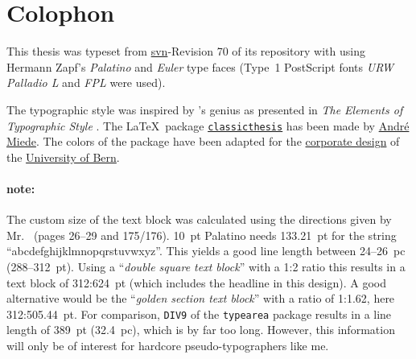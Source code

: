 \pagestyle{empty}
\hfill
\vfill
\section*{Colophon}
This thesis was typeset from \href{http://subversion.apache.org/}{\acs{svn}}-Revision 70 of its repository with \href{http://www.latex-project.org/}{\LaTeXe} using Hermann Zapf's \emph{Palatino} and \emph{Euler} type faces (Type~1 PostScript fonts \emph{URW Palladio L} and \emph{FPL} were used).

The typographic style was inspired by 's genius as presented in \emph{The Elements of Typographic Style} \citep{bringhurst:2002}. The \LaTeX\ package \href{http://www.ctan.org/tex-archive/macros/latex/contrib/classicthesis/}{\texttt{classicthesis}} has been made by \href{http://www.miede.de}{André Miede}. The colors of the package have been adapted for the \href{http://www.kommunikation.unibe.ch/intern/content/beratung/corporate_design/logo_schriften__farben/}{corporate design} of the \href{http://www.unibe.ch/}{University of Bern}.

\paragraph{note:} The custom size of the text block was calculated using the directions given by Mr.\ \citeauthor{bringhurst:2002} (pages 26--29 and 175/176). \SI{10}{pt} Palatino needs \SI{133.21}{pt} for the string ``abcdefghijklmnopqrstuvwxyz''. This yields a good line length between 24--\SI{26}{pc} (288--\SI{312}{pt}). Using a ``\emph{double square text block}'' with a 1:2 ratio this results in a text block of 312:\SI{624}{pt} (which includes the headline in this design). A good alternative would be the ``\emph{golden section text block}'' with a ratio of 1:1.62, here 312:\SI{505.44}{pt}. For comparison, \texttt{DIV9} of the \texttt{typearea} package results in a line length of \SI{389}{pt} (\SI{32.4}{pc}), which is by far too long. However, this information will only be of interest for hardcore pseudo-typographers like me.

%

\bigskip

\noindent \finalVersionString